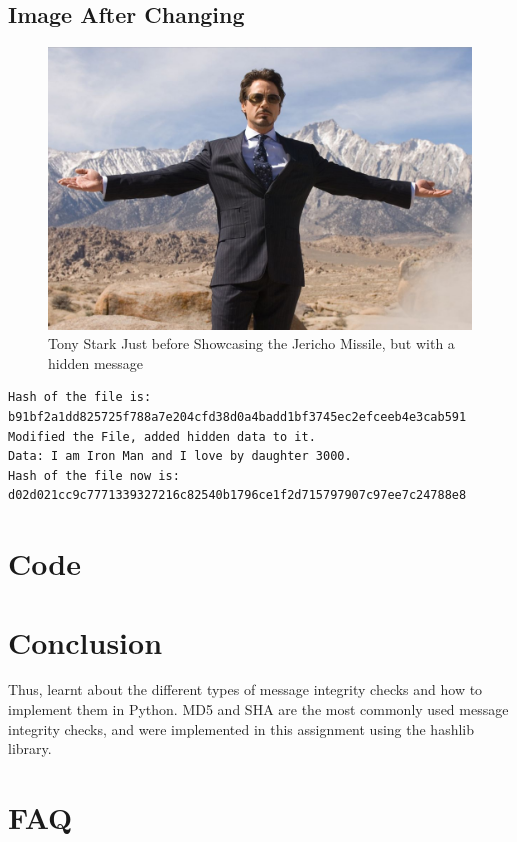 \documentclass[11pt]{article}
\begin{document}
\subsection*{Image After Changing}
\begin{figure}[H]
    \centering
    \includegraphics[width=.90\textwidth]{tony_changed.jpg}
    \caption{Tony Stark Just before Showcasing the Jericho Missile, but with a hidden message}
\end{figure}

\begin{verbatim}
Hash of the file is: 
b91bf2a1dd825725f788a7e204cfd38d0a4badd1bf3745ec2efceeb4e3cab591
Modified the File, added hidden data to it.
Data: I am Iron Man and I love by daughter 3000.
Hash of the file now is: 
d02d021cc9c7771339327216c82540b1796ce1f2d715797907c97ee7c24788e8
\end{verbatim}


\section{Code}


\section{Conclusion}
Thus, learnt about the different types of message integrity checks and how to implement them in Python.
MD5 and SHA are the most commonly used message integrity checks, and were implemented in this assignment using the hashlib library.

\clearpage

\section{FAQ}
\end{document}
